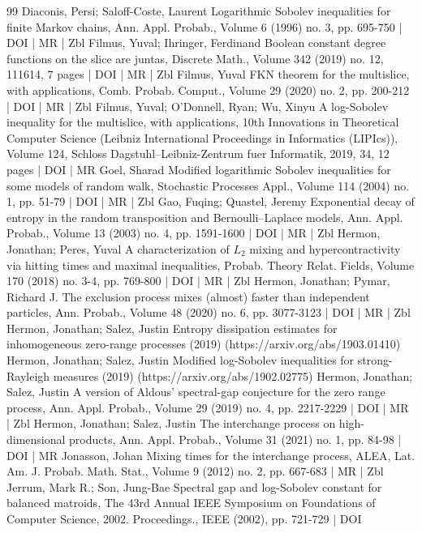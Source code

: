 \documentclass[10pt]{amsart}
\theoremstyle{definition}\newtheorem{defi}[theo]{Definition}\newtheorem{rema}[theo]{Remark}\newtheorem{exam}[theo]{Example}\newtheorem{exem}[theo]{Example}\newtheorem{nota}[theo]{Notation}
\begin{document}
\begin{thebibliography}{99}
Diaconis, Persi; Saloff-Coste, Laurent Logarithmic Sobolev inequalities for finite Markov chains, Ann. Appl. Probab., Volume 6 (1996) no. 3, pp. 695-750 | DOI | MR | Zbl
Filmus, Yuval; Ihringer, Ferdinand Boolean constant degree functions on the slice are juntas, Discrete Math., Volume 342 (2019) no. 12, 111614, 7 pages | DOI | MR | Zbl
Filmus, Yuval FKN theorem for the multislice, with applications, Comb. Probab. Comput., Volume 29 (2020) no. 2, pp. 200-212 | DOI | MR | Zbl
Filmus, Yuval; O’Donnell, Ryan; Wu, Xinyu A log-Sobolev inequality for the multislice, with applications, 10th Innovations in Theoretical Computer Science (Leibniz International Proceedings in Informatics (LIPIcs)), Volume 124, Schloss Dagstuhl–Leibniz-Zentrum fuer Informatik, 2019, 34, 12 pages | DOI | MR
Goel, Sharad Modified logarithmic Sobolev inequalities for some models of random walk, Stochastic Processes Appl., Volume 114 (2004) no. 1, pp. 51-79 | DOI | MR | Zbl
Gao, Fuqing; Quastel, Jeremy Exponential decay of entropy in the random transposition and Bernoulli–Laplace models, Ann. Appl. Probab., Volume 13 (2003) no. 4, pp. 1591-1600 | DOI | MR | Zbl
Hermon, Jonathan; Peres, Yuval A characterization of ${L}_2$ mixing and hypercontractivity via hitting times and maximal inequalities, Probab. Theory Relat. Fields, Volume 170 (2018) no. 3-4, pp. 769-800 | DOI | MR | Zbl
Hermon, Jonathan; Pymar, Richard J. The exclusion process mixes (almost) faster than independent particles, Ann. Probab., Volume 48 (2020) no. 6, pp. 3077-3123 | DOI | MR | Zbl
Hermon, Jonathan; Salez, Justin Entropy dissipation estimates for inhomogeneous zero-range processes (2019) (https://arxiv.org/abs/1903.01410)
Hermon, Jonathan; Salez, Justin Modified log-Sobolev inequalities for strong-Rayleigh measures (2019) (https://arxiv.org/abs/1902.02775)
Hermon, Jonathan; Salez, Justin A version of Aldous’ spectral-gap conjecture for the zero range process, Ann. Appl. Probab., Volume 29 (2019) no. 4, pp. 2217-2229 | DOI | MR | Zbl
Hermon, Jonathan; Salez, Justin The interchange process on high-dimensional products, Ann. Appl. Probab., Volume 31 (2021) no. 1, pp. 84-98 | DOI | MR
Jonasson, Johan Mixing times for the interchange process, ALEA, Lat. Am. J. Probab. Math. Stat., Volume 9 (2012) no. 2, pp. 667-683 | MR | Zbl
Jerrum, Mark R.; Son, Jung-Bae Spectral gap and log-Sobolev constant for balanced matroids, The 43rd Annual IEEE Symposium on Foundations of Computer Science, 2002. Proceedings., IEEE (2002), pp. 721-729 | DOI

\end{thebibliography}
\end{document}
